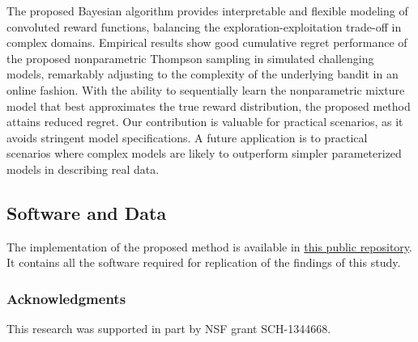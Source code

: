 \documentclass{article}
\def\addappendix{}
\begin{document}
The proposed Bayesian algorithm provides interpretable and flexible modeling of convoluted reward functions, balancing the exploration-exploitation trade-off in complex domains. Empirical results show good cumulative regret performance of the proposed nonparametric Thompson sampling in simulated challenging models, remarkably adjusting to the complexity of the underlying bandit in an online fashion. With the ability to sequentially learn the nonparametric mixture model that best approximates the true reward distribution, the proposed method attains reduced regret. Our contribution is valuable for practical scenarios, as it avoids stringent model specifications. A future application is to practical scenarios where complex models are likely to outperform simpler parameterized models in describing real data.

\subsection{Software and Data}
The implementation of the proposed method is available in \href{https://github.com/iurteaga/bandits}{this public repository}. It contains all the software required for replication of the findings of this study.

\subsubsection*{Acknowledgments}
This research was supported in part by NSF grant SCH-1344668.




\ifx\addappendix\undefined 
\end{document}
